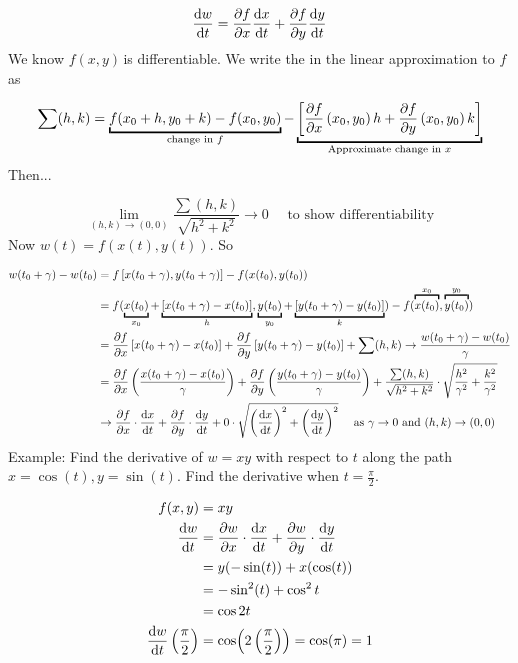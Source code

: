\documentclass{article}
\newcommand{\n}{\leavevmode \newline} %
\newcommand{\fxy}{$f(x,y)\,$} %
\newcommand{\as}{\text{ as }} %
\numberwithin{equation}{subsection} %
\begin{document}
\begin{equation}
    \dv{w}{t}=\pdv{f}{x}\dv{x}{t}+\pdv{f}{y}\dv{y}{t}
\end{equation}
\n
We know \fxy is differentiable. We write the  in the linear approximation to $f$ as

\begin{equation}
    \sum (h,k) = \underbracket{f(x_0+h,y_0+k)-f(x_0,y_0)}_{\text{change in } f} - \underbracket{\left[\pdv{f}{x}\left(x_0,y_0\right)h+\pdv{f}{y}\left(x_0,y_0\right)k \right]}_{\text{Approximate change in } x}
\end{equation}
\n
Then...

\begin{equation}
    \lim_{(h,k)\to(0,0)}\frac{\sum (h,k)}{\sqrt{h^2+k^2}}\to 0 \quad\text{ to show differentiability}
\end{equation}
\n
Now $w(t)=f(x(t),y(t))$. So

\begin{equation}
    \begin{split}
        w(t_0+\gamma)-w(t_0)&=f\left[x(t_0+\gamma),y(t_0+\gamma)\right]-f(x(t_0),y(t_0))\\
        &= f(\underbracket{x(t_0)}_{x_0}+\underbracket{\left[x(t_0+\gamma)-x(t_0)\right]}_{h}, \underbracket{y(t_0)}_{y_0}+\underbracket{\left[y(t_0+\gamma)-y(t_0)\right]}_{k})-f(\overbracket{x(t_0)}^{x_0},\overbracket{y(t_0)}^{y_0})\\
        &= \pdv{f}{x}\left[x(t_0+\gamma)-x(t_0)\right]+\pdv{f}{y}\left[y(t_0+\gamma)-y(t_0)\right]+\sum (h,k) \to \frac{w(t_0+\gamma)-w(t_0)}{\gamma}\\
        &=\pdv{f}{x}\left(\frac{x(t_0+\gamma)-x(t_0)}{\gamma}\right)+\pdv{f}{y}\left(\frac{y(t_0+\gamma)-y(t_0)}{\gamma}\right)+\frac{\sum (h,k)}{\sqrt{h^2+k^2}}\cdot\sqrt{\frac{h^2}{\gamma^2}+\frac{k^2}{\gamma^2}}\\
        &\to \pdv{f}{x}\cdot \dv{x}{t}+ \pdv{f}{y}\cdot \dv{y}{t} + 0 \cdot \sqrt{\left(\dv{x}{t}\right)^2+\left(\dv{y}{t}\right)^2} \quad \as \gamma\to 0 \text{ and } (h,k)\to (0,0)
    \end{split}
\end{equation}
\n
Example: Find the derivative of $w=xy$ with respect to $t$ along the path $x=\cos(t),y=\sin(t)$. Find the derivative when $t=\frac{\pi}{2}$.

\begin{equation}
    \begin{split}
        f(x,y)&=xy\\
        \dv{w}{t}&=\pdv{w}{x}\cdot\dv{x}{t}+\pdv{w}{y}\cdot\dv{y}{t}\\
        &=y(-\sin(t))+x(\cos(t))\\
        &=-\sin^2(t)+\cos^2{t}\\
        &=\cos{2t}\\
        \dv{w}{t}\left(\frac{\pi}{2}\right)&=\cos(2\left(\frac{\pi}{2}\right))=\cos(\pi)=1
    \end{split}
\end{equation}
\end{document}
